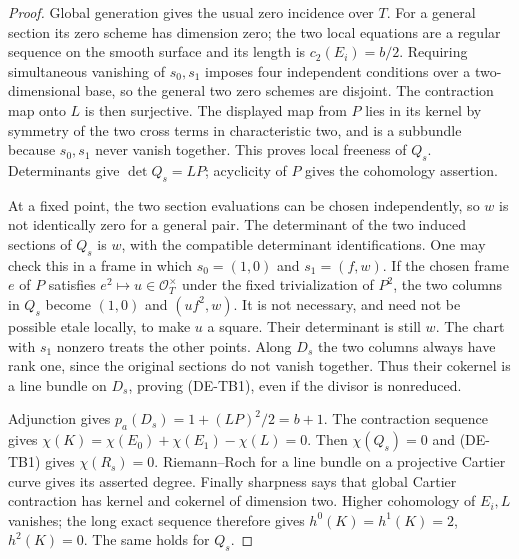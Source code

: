 \begin{proof}
Global generation gives the usual zero incidence over $T$.
For a general section its zero scheme has dimension zero;
the two local equations are a regular sequence on the smooth
surface and its length is $c_2(E_i)=b/2$.
Requiring simultaneous vanishing of $s_0,s_1$ imposes four
independent conditions over a two-dimensional base, so the
general two zero schemes are disjoint. The contraction map
onto $L$ is then surjective. The displayed map from $P$ lies
in its kernel by symmetry of the two cross terms in
characteristic two, and is a subbundle because $s_0,s_1$
never vanish together. This proves local freeness of $Q_s$.
Determinants give $\det Q_s=LP$; acyclicity of $P$ gives the
cohomology assertion.

At a fixed point, the two section evaluations can be chosen
independently, so $w$ is not identically zero for a general
pair. The determinant of the two induced sections of $Q_s$
is $w$, with the compatible determinant identifications.
One may check this in a frame in which
$s_0=(1,0)$ and $s_1=(f,w)$. If the chosen frame $e$ of $P$
satisfies $e^2\mapsto u\in\mathcal O_T^\times$ under the
fixed trivialization of $P^2$, the two columns in $Q_s$ become
$(1,0)$ and $(u f^2,w)$. It is not necessary, and need not
be possible etale locally, to make $u$ a square.
Their determinant is still $w$. The chart with $s_1$ nonzero treats
the other points. Along $D_s$ the two columns always have
rank one, since the original sections do not vanish together.
Thus their cokernel is a line bundle on $D_s$, proving
(DE-TB1), even if the divisor is nonreduced.

Adjunction gives $p_a(D_s)=1+(LP)^2/2=b+1$.
The contraction sequence gives
$\chi(K)=\chi(E_0)+\chi(E_1)-\chi(L)=0$.
Then $\chi(Q_s)=0$ and (DE-TB1) gives $\chi(R_s)=0$.
Riemann--Roch for a line bundle on a projective Cartier
curve gives its asserted degree.
Finally sharpness says that global Cartier contraction has
kernel and cokernel of dimension two. Higher cohomology
of $E_i,L$ vanishes; the long exact sequence therefore gives
$h^0(K)=h^1(K)=2$, $h^2(K)=0$. The same holds for $Q_s$.
\end{proof}

